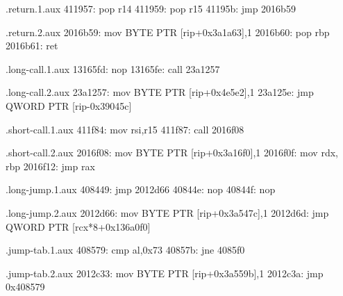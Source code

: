 {%


\begin{filecontents*}{\jobname.return.1.aux}
411957: pop  r14
411959: pop  r15
41195b: jmp  2016b59
\end{filecontents*}

\begin{filecontents*}{\jobname.return.2.aux}
2016b59: mov BYTE PTR [rip+0x3a1a63],1
2016b60: pop rbp
2016b61: ret 
\end{filecontents*}

\begin{filecontents*}{\jobname.long-call.1.aux}
13165fd: nop
13165fe: call 23a1257
\end{filecontents*}

\begin{filecontents*}{\jobname.long-call.2.aux}
23a1257: mov BYTE PTR [rip+0x4e5e2],1
23a125e: jmp QWORD PTR [rip-0x39045c]
\end{filecontents*}

\begin{filecontents*}{\jobname.short-call.1.aux}
411f84: mov  rsi,r15
411f87: call 2016f08 
\end{filecontents*}

\begin{filecontents*}{\jobname.short-call.2.aux}
2016f08: mov BYTE PTR [rip+0x3a16f0],1
2016f0f: mov rdx, rbp
2016f12: jmp rax
\end{filecontents*}

\begin{filecontents*}{\jobname.long-jump.1.aux}
408449: jmp  2012d66
40844e: nop
40844f: nop
\end{filecontents*}

\begin{filecontents*}{\jobname.long-jump.2.aux}
2012d66: mov BYTE PTR [rip+0x3a547c],1
2012d6d: jmp QWORD PTR [rcx*8+0x136a0f0]
\end{filecontents*}

\begin{filecontents*}{\jobname.jump-tab.1.aux}
408579: cmp al,0x73
40857b: jne 4085f0 
\end{filecontents*}

\begin{filecontents*}{\jobname.jump-tab.2.aux}
2012c33: mov BYTE PTR [rip+0x3a559b],1
2012c3a: jmp 0x408579    
\end{filecontents*}

}
